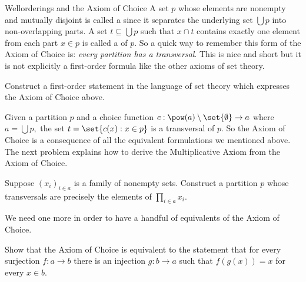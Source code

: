 \begin{unit}{Wellorderings and the Axiom of Choice}
\noindent
A set \(p\) whose elements are nonempty and mutually disjoint is called a  since it separates the underlying set \(\bigcup p\) into non-overlapping parts.
A set \(t \subseteq \bigcup p\) such that \(x \cap t\) contains exactly one element from each part \(x \in p\) is called a  of \(p.\)
So a quick way to remember this form of the Axiom of Choice is: \textit{every partition has a transversal}.
This is nice and short but it is not explicitly a first-order formula like the other axioms of set theory.

\begin{problem}
  Construct a first-order statement in the language of set theory which expresses the Axiom of Choice above.
\end{problem}

Given a partition \(p\) and a choice function \(c:\pow(a)\setminus\set{\emptyset}\to a\) where \(a = \bigcup p,\) the set \(t = \set{c(x) : x \in p}\) is a transversal of \(p.\)
So the Axiom of Choice is a consequence of all the equivalent formulations we mentioned above.
The next problem explains how to derive the Multiplicative Axiom from the Axiom of Choice.

\begin{problem}
  Suppose \((x_i)_{i \in a}\) is a family of nonempty sets.
  Construct a partition \(p\) whose transversals are precisely the elements of \(\prod_{i \in a} x_i.\)
\end{problem}

\noindent
We need one more in order to have a handful of equivalents of the Axiom of Choice.

\begin{problem}
  Show that the Axiom of Choice is equivalent to the statement that for every surjection \(f:a \to b\) there is an injection \(g:b \to a\) such that \(f(g(x)) = x\) for every \(x \in b.\)
\end{problem}

\end{unit}
\endinput

